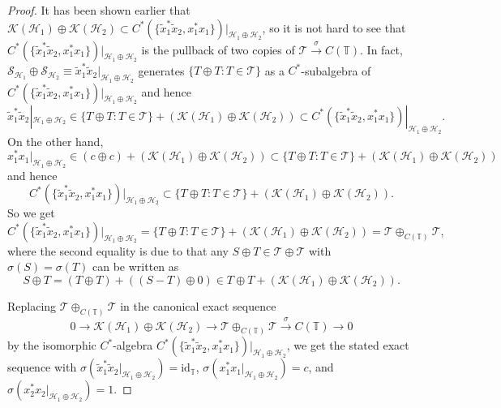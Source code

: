 \documentclass[11pt]{article}
\numberwithin{equation}{section}
\begin{document}
\begin{proof}
It has been shown earlier that $\mathcal{K}( \mathcal{H}_{1})
\oplus\mathcal{K}( \mathcal{H}_{2}) \subset C^{\ast}(
\{ \tilde{x}_{1}^{\ast}\tilde{x}_{2},x_{1}^{\ast}x_{1}\} )
|_{\mathcal{H}_{1}\oplus\mathcal{H}_{2}}$, so it is not hard to see that
$C^{\ast}( \{ \tilde{x}_{1}^{\ast}\tilde{x}_{2},x_{1}^{\ast}%
x_{1} \} ) |_{\mathcal{H}_{1}\oplus\mathcal{H}_{2}}$ is the
pullback of two copies of $\mathcal{T}\overset{\sigma}{\rightarrow}C(
\mathbb{T}) $. In fact, $\mathcal{S}_{\mathcal{H}_{1}}\oplus
\mathcal{S}_{\mathcal{H}_{2}}\equiv\tilde{x}_{1}^{\ast}\tilde{x}%
_{2}|_{\mathcal{H}_{1}\oplus\mathcal{H}_{2}}$ generates $ \{ T\oplus
T\colon T\in\mathcal{T} \} $ as a $C^*$-subalgebra of $C^{\ast}( \{
\tilde{x}_{1}^{\ast}\tilde{x}_{2},x_{1}^{\ast}x_{1} \} )
|_{\mathcal{H}_{1}\oplus\mathcal{H}_{2}}$ and hence%
\[
\tilde{x}_{1}^{\ast}\tilde{x}_{2}|_{\mathcal{H}_{1}\oplus\mathcal{H}_{2}}%
\in \{ T\oplus T\colon T\in\mathcal{T} \} +( \mathcal{K}(
\mathcal{H}_{1}) \oplus\mathcal{K}( \mathcal{H}_{2})
) \subset C^{\ast}( \{ \tilde{x}_{1}^{\ast}\tilde{x}%
_{2},x_{1}^{\ast}x_{1} \} ) |_{\mathcal{H}_{1}\oplus
\mathcal{H}_{2}}.
\]
On the other hand,
\[
x_{1}^{\ast}x_{1}|_{\mathcal{H}_{1}\oplus\mathcal{H}_{2}}\in( c\oplus
c) +( \mathcal{K}( \mathcal{H}_{1}) \oplus
\mathcal{K}( \mathcal{H}_{2}) ) \subset \{ T\oplus
T\colon T\in\mathcal{T} \} +( \mathcal{K}( \mathcal{H}_{1})
\oplus\mathcal{K}( \mathcal{H}_{2}) )
\]
and hence
\[
C^{\ast}( \{ \tilde{x}_{1}^{\ast}\tilde{x}_{2},x_{1}^{\ast}
x_{1} \} ) |_{\mathcal{H}_{1}\oplus\mathcal{H}_{2}}
\subset \{ T\oplus T\colon T\in\mathcal{T} \} +( \mathcal{K}(
\mathcal{H}_{1}) \oplus\mathcal{K}( \mathcal{H}_{2})) .
\]
So we get
\[
C^{\ast}( \{ \tilde{x}_{1}^{\ast}\tilde{x}_{2},x_{1}^{\ast}%
x_{1} \} ) |_{\mathcal{H}_{1}\oplus\mathcal{H}_{2}}= \{
T\oplus T\colon T\in\mathcal{T} \} +( \mathcal{K}( \mathcal{H}%
_{1}) \oplus\mathcal{K}( \mathcal{H}_{2}) )
=\mathcal{T}\oplus_{C(\mathbb{T}) }\mathcal{T},
\]
where the second equality is due to that any $S\oplus T\in\mathcal{T}%
\oplus\mathcal{T}$ with $\sigma( S) =\sigma(T) $
can be written as
\[
S\oplus T=( T\oplus T) +( ( S-T)
\oplus0) \in T\oplus T+( \mathcal{K}( \mathcal{H}
_{1}) \oplus\mathcal{K}( \mathcal{H}_{2}) ) .
\]

Replacing $\mathcal{T}\oplus_{C(\mathbb{T}) }\mathcal{T}$ in the
canonical exact sequence
\[
0\rightarrow\mathcal{K}( \mathcal{H}_{1}) \oplus\mathcal{K}%
( \mathcal{H}_{2}) \rightarrow\mathcal{T}\oplus_{C(
\mathbb{T}) }\mathcal{T}\overset{\sigma}{\rightarrow}C(
\mathbb{T}) \rightarrow0
\]
by the isomorphic $C^*$-algebra $C^{\ast}( \{ \tilde{x}_{1}^{\ast
}\tilde{x}_{2},x_{1}^{\ast}x_{1} \} ) |_{\mathcal{H}_{1}%
\oplus\mathcal{H}_{2}}$, we get the stated exact sequence with $\sigma(
\tilde{x}_{1}^{\ast}\tilde{x}_{2}|_{\mathcal{H}_{1}\oplus\mathcal{H}_{2}%
}) =\mathrm{id}_{\mathbb{T}}$, $\sigma( x_{1}^{\ast}%
x_{1}|_{\mathcal{H}_{1}\oplus\mathcal{H}_{2}}) =c$, and $\sigma(
x_{2}^{\ast}x_{2}|_{\mathcal{H}_{1}\oplus\mathcal{H}_{2}}) =1$.
\end{proof}
\end{document}
